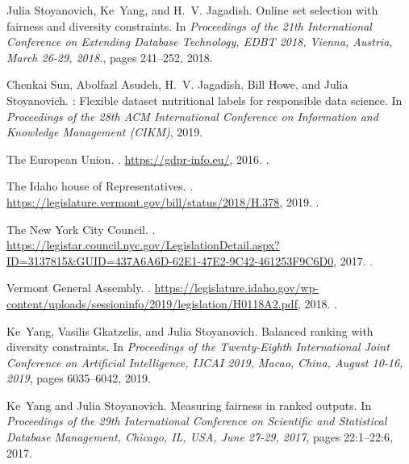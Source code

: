 Julia Stoyanovich, Ke~Yang, and H.~V. Jagadish.
\newblock Online set selection with fairness and diversity constraints.
\newblock In {\em Proceedings of the 21th International Conference on Extending
  Database Technology, {EDBT} 2018, Vienna, Austria, March 26-29, 2018.}, pages
  241--252, 2018.

Chenkai Sun, Abolfazl Asudeh, H.~V. Jagadish, Bill Howe, and Julia Stoyanovich.
: Flexible dataset nutritional labels for responsible
  data science.
\newblock In {\em Proceedings of the 28th {ACM} International Conference on
  Information and Knowledge Management ({CIKM})}, 2019.

{The European Union}.
.
\newblock \url{https://gdpr-info.eu/}, 2016.
.

{The Idaho house of Representatives}.
.
\newblock \url{https://legislature.vermont.gov/bill/status/2018/H.378}, 2019.
.

{The New York City Council}.
.
\newblock
  \url{https://legistar.council.nyc.gov/LegislationDetail.aspx?ID=3137815&GUID=437A6A6D-62E1-47E2-9C42-461253F9C6D0},
  2017.
.

{Vermont General Assembly}.
.
\newblock
  \url{https://legislature.idaho.gov/wp-content/uploads/sessioninfo/2019/legislation/H0118A2.pdf},
  2018.
.

Ke~Yang, Vasilis Gkatzelis, and Julia Stoyanovich.
\newblock Balanced ranking with diversity constraints.
\newblock In {\em Proceedings of the Twenty-Eighth International Joint
  Conference on Artificial Intelligence, {IJCAI} 2019, Macao, China, August
  10-16, 2019}, pages 6035--6042, 2019.

Ke~Yang and Julia Stoyanovich.
\newblock Measuring fairness in ranked outputs.
\newblock In {\em Proceedings of the 29th International Conference on
  Scientific and Statistical Database Management, Chicago, IL, USA, June 27-29,
  2017}, pages 22:1--22:6, 2017.

